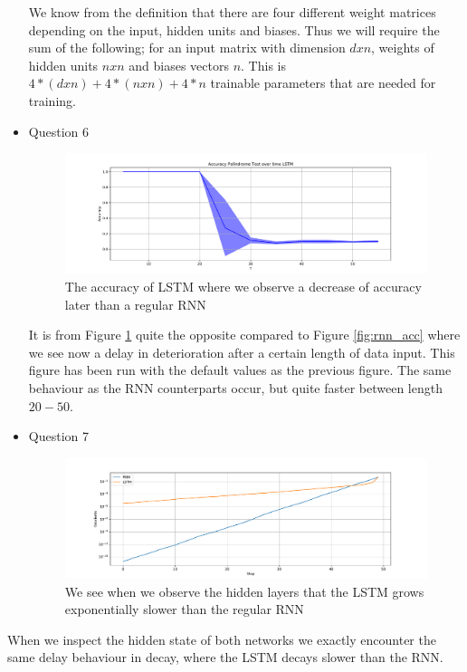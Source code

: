 \documentclass{article}
\begin{document}
\begin{itemize}
  We know from the definition that there are four different weight matrices depending on the input, hidden units and biases. Thus we will require the sum of the following; for an input matrix with dimension $d x n$, weights of hidden units $ n x n$ and biases vectors $n$. This is $4 *(d x n) + 4*( n x n) + 4 * n$  trainable parameters that are needed for training. 
  \item Question 6
  \begin{figure}[H]
      \centering
      \includegraphics[width=\linewidth]{LSTM_acc_.pdf}
      \caption{The accuracy of LSTM where we observe a decrease of accuracy later than a regular RNN}
      \label{fig:lstm_acc}
  \end{figure}
  It is from Figure \ref{fig:lstm_acc} quite the opposite compared to Figure \ref{fig:rnn_acc} where we see now a delay in deterioration after a certain length of data input. This figure has been run with the default values as the previous figure. The same behaviour as the RNN counterparts occur, but quite faster between length $20 - 50$. 
  \item Question 7
  \begin{figure}[H]
      \centering
      \includegraphics[width=\linewidth]{hidden_gradients.pdf}
      \caption{We see when we observe the hidden layers that the LSTM grows exponentially slower than the regular RNN }
      \label{fig:hidden_lstm_rnn}
  \end{figure}
\end{itemize}
When we inspect the hidden state of both networks we exactly encounter the same delay behaviour in decay, where the LSTM decays slower than the RNN.  
\end{document}
